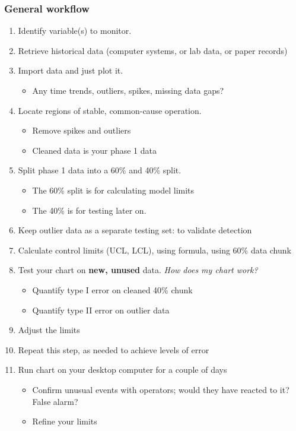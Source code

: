 \begin{frame}[allowframebreaks]\frametitle{General workflow}
	\begin{enumerate}
		\item	Identify variable(s) to monitor.
		\item	Retrieve historical data (computer systems, or lab data, or paper records)
		\item	Import data and just plot it.
		\begin{itemize}
			\item	Any time trends, outliers, spikes, missing data gaps?
		\end{itemize}
		\item	Locate regions of stable, common-cause operation.
		\begin{itemize}
			\item	Remove spikes and outliers
			\item	Cleaned data is your phase 1 data
		\end{itemize}
		\item	Split phase 1 data into a 60\% and 40\% split.
		\begin{itemize}
			\item	The 60\% split is for calculating model limits
			\item	The 40\% is for testing later on.
		\end{itemize}
		\item	Keep outlier data as a separate testing set: to validate detection
		\item	Calculate control limits (UCL, LCL), using formula, using 60\% data chunk
		\item	Test your chart on \textbf{new, unused} data. \emph{How does my chart work?}
		\begin{itemize}
			\item	Quantify type I error on cleaned 40\% chunk
			\item	Quantify type II error on outlier data
		\end{itemize}
		\item	Adjust the limits
		\item	Repeat this step, as needed to achieve levels of error
		\item	Run chart on your desktop computer for a couple of days
		\begin{itemize}
			\item	Confirm unusual events with operators; would they have reacted to it? False alarm?
			\item	Refine your limits

\end{itemize}
\end{enumerate}
\end{frame}
